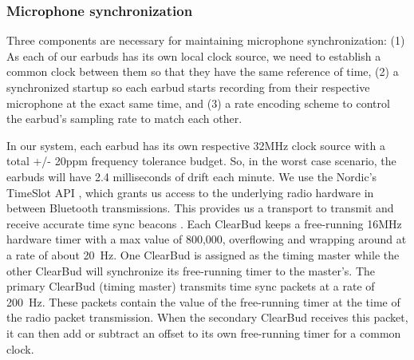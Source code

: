 \documentclass [11pt, proquest] {uwthesis}[2020/02/24]
\begin{document}




\subsubsection{Microphone synchronization} Three components are necessary for maintaining microphone synchronization: (1) As each of our earbuds has its own local clock source, we need to establish a common clock between them so that they have the same reference of time, (2) a synchronized startup so each earbud starts recording from their respective microphone at the exact same time, and (3) a rate encoding scheme to control the earbud's sampling rate to match each other. 

In our system, each earbud has its own respective 32MHz clock source with a total +/- 20ppm frequency tolerance budget. So, in the worst case scenario, the earbuds will have 2.4 milliseconds of drift each minute. We  use the  Nordic's TimeSlot API \cite{timeslot}, which grants us access to the underlying radio hardware in between Bluetooth transmissions. This provides us a transport to transmit and receive accurate time sync beacons \cite{wireless-timesync}. Each ClearBud keeps a free-running 16MHz hardware timer with a max value of 800,000, overflowing and wrapping around at a rate of about 20~Hz. One ClearBud is assigned as the timing master while the other ClearBud will synchronize its free-running timer to the master's.  The primary ClearBud (timing master) transmits time sync packets at a rate of 200~Hz. These packets contain the value of the free-running timer at the time of the radio packet transmission. When the secondary ClearBud receives this packet, it can then add or subtract an offset to its own free-running timer for a common clock. %
\end{document}
